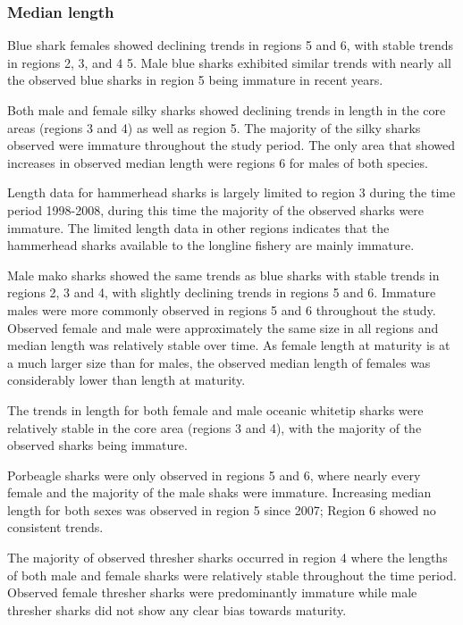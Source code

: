 \documentclass[12pt]{SCreport}
\begin{document}
\subsubsection{Median length}
Blue shark females showed declining trends in regions 5 and 6, with stable trends in regions 2, 3, and 4 5. Male blue sharks exhibited similar trends with nearly all the observed blue sharks in region 5 being immature in recent years. 

Both male and female silky sharks showed declining trends in length in the core areas (regions 3 and 4) as well as region 5.  The majority of the silky sharks observed were immature throughout the study period. The only area  that showed increases in observed median length were regions 6 for males of both species. 

Length data for hammerhead sharks is largely limited to region 3 during the time period 1998-2008, during this time the majority of the observed sharks were immature. The limited length data in other regions indicates that the hammerhead sharks available to the longline fishery are mainly immature.

Male mako sharks showed the same trends as blue sharks with stable trends in regions 2, 3 and 4, with slightly declining trends in regions 5 and 6. Immature males were more commonly observed in regions 5 and 6 throughout the study.  Observed female and male were approximately the same size in all regions and median length was relatively stable over time.  As female length at maturity is at a much larger size than for males, the observed median length of females was considerably lower than length at maturity.

The trends in length for both female and male oceanic whitetip sharks were relatively stable in the core area (regions 3 and 4), with the majority of the observed sharks being immature.  

Porbeagle sharks were only observed in regions 5 and 6, where nearly every female and the majority of the male shaks were immature.  Increasing median length for both sexes was observed in region 5 since 2007; Region 6 showed no consistent trends.

The majority of observed thresher sharks occurred in region 4 where the lengths of both male and female sharks were relatively stable throughout the time period. Observed female thresher sharks were predominantly immature while male thresher sharks did not show any clear bias towards maturity.
\end{document}
